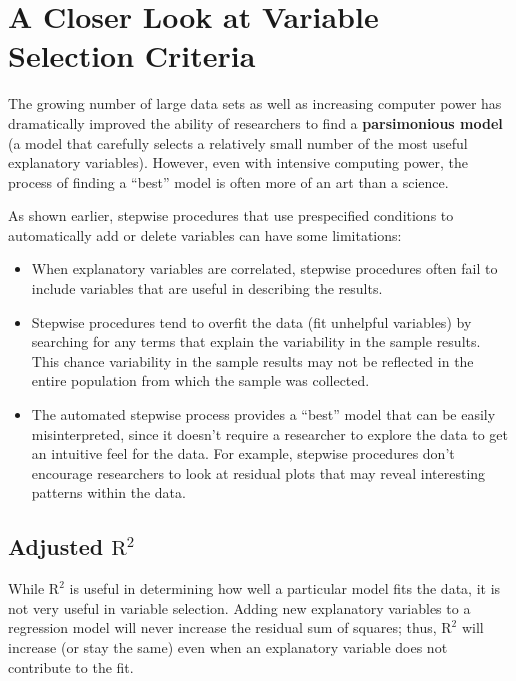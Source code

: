 \documentclass[
]{book}
\begin{document}
\hypertarget{a-closer-look-at-variable-selection-criteria}{%
\section{A Closer Look at Variable Selection Criteria}\label{a-closer-look-at-variable-selection-criteria}}

The growing number of large data sets as well as increasing computer power has dramatically improved the ability of researchers to find a \textbf{parsimonious model} (a model that carefully selects a relatively small number of the most useful explanatory variables). However, even with intensive computing power, the process of finding a ``best'' model is often more of an art than a science.

As shown earlier, stepwise procedures that use prespecified conditions to automatically add or delete variables can have some limitations:

\begin{itemize}
\item
  When explanatory variables are correlated, stepwise procedures often fail to include variables that are useful in describing the results.
\item
  Stepwise procedures tend to overfit the data (fit unhelpful variables) by searching for any terms that explain the variability in the sample results. This chance variability in the sample results may not be reflected in the entire population from which the sample was collected.
\item
  The automated stepwise process provides a ``best'' model that can be easily misinterpreted, since it doesn't require a researcher to explore the data to get an intuitive feel for the data. For example, stepwise procedures don't encourage researchers to look at residual plots that may reveal interesting patterns within the data.
\end{itemize}

\hypertarget{adjusted-mathrmr2}{%
\subsection*{\texorpdfstring{Adjusted \(\mathrm{R}^2\)}{Adjusted \textbackslash mathrm\{R\}\^{}2}}\label{adjusted-mathrmr2}}

While \(\mathrm{R}^2\) is useful in determining how well a particular model fits the data, it is not very useful in variable selection. Adding new explanatory variables to a regression model will never increase the residual sum of squares; thus, \(\mathrm{R}^2\) will increase (or stay the same) even when an explanatory variable does not contribute to the fit.
\end{document}
